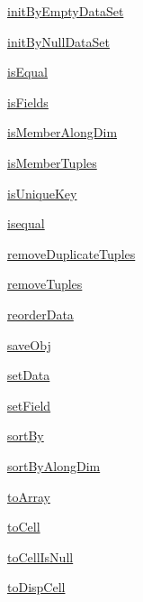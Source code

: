 \begin{list}{}{}
 \item \hyperref[method:smartdb.relations.ATypifiedStaticRelation.initByEmptyDataSet]{initByEmptyDataSet}
 \item \hyperref[method:smartdb.relations.ATypifiedStaticRelation.initByNullDataSet]{initByNullDataSet}
 \item \hyperref[method:smartdb.relations.ATypifiedStaticRelation.isEqual]{isEqual}
 \item \hyperref[method:smartdb.relations.ATypifiedStaticRelation.isFields]{isFields}
 \item \hyperref[method:smartdb.relations.ATypifiedStaticRelation.isMemberAlongDim]{isMemberAlongDim}
 \item \hyperref[method:smartdb.relations.ATypifiedStaticRelation.isMemberTuples]{isMemberTuples}
 \item \hyperref[method:smartdb.relations.ATypifiedStaticRelation.isUniqueKey]{isUniqueKey}
 \item \hyperref[method:smartdb.relations.ATypifiedStaticRelation.isequal]{isequal}
 \item \hyperref[method:smartdb.relations.ATypifiedStaticRelation.removeDuplicateTuples]{removeDuplicateTuples}
 \item \hyperref[method:smartdb.relations.ATypifiedStaticRelation.removeTuples]{removeTuples}
 \item \hyperref[method:smartdb.relations.ATypifiedStaticRelation.reorderData]{reorderData}
 \item \hyperref[method:smartdb.relations.ATypifiedStaticRelation.saveObj]{saveObj}
 \item \hyperref[method:smartdb.relations.ATypifiedStaticRelation.setData]{setData}
 \item \hyperref[method:smartdb.relations.ATypifiedStaticRelation.setField]{setField}
 \item \hyperref[method:smartdb.relations.ATypifiedStaticRelation.sortBy]{sortBy}
 \item \hyperref[method:smartdb.relations.ATypifiedStaticRelation.sortByAlongDim]{sortByAlongDim}
 \item \hyperref[method:smartdb.relations.ATypifiedStaticRelation.toArray]{toArray}
 \item \hyperref[method:smartdb.relations.ATypifiedStaticRelation.toCell]{toCell}
 \item \hyperref[method:smartdb.relations.ATypifiedStaticRelation.toCellIsNull]{toCellIsNull}
 \item \hyperref[method:smartdb.relations.ATypifiedStaticRelation.toDispCell]{toDispCell}

\end{list}

